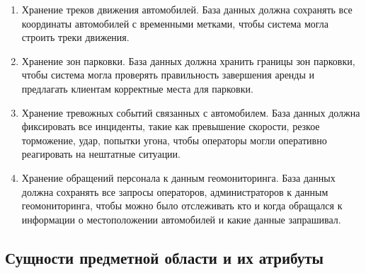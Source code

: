 \begin{enumerate}
\item Хранение треков движения автомобилей. База данных должна сохранять все координаты автомобилей с временными метками, чтобы система могла строить треки движения.

\item Хранение зон парковки. База данных должна хранить границы зон парковки, чтобы система могла проверять правильность завершения аренды и предлагать клиентам корректные места для парковки.

\item Хранение тревожных событий связанных с автомобилем. База данных должна фиксировать все инциденты, такие как превышение скорости, резкое торможение, удар, попытки угона, чтобы операторы могли оперативно реагировать на нештатные ситуации.

\item Хранение обращений персонала к данным геомониторинга. База данных должна сохранять все запросы операторов, администраторов к данным геомониторинга, чтобы можно было отслеживать кто и когда обращался к информации о местоположении автомобилей и какие данные запрашивал.
\end{enumerate}

\subsection{Сущности предметной области и их атрибуты}

